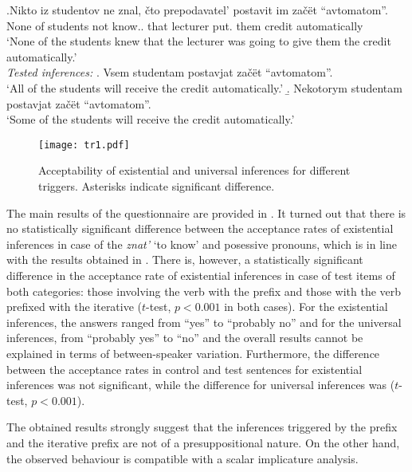 \exg.\label{ex:znat}Nikto iz studentov ne znal, \v{c}to prepodavatel' postavit im za\v{c}\"{e}t ``avtomatom''.\\
None of students not know.. that lecturer put. them credit automatically\\
\trans `None of the students knew that the lecturer was going to give them the credit automatically.'\smallskip\\
\textit{Tested inferences:}
\a. Vsem studentam postavjat za\v{c}\"et ``avtomatom''.\\
 `All of the students will receive the credit automatically.'
\b. Nekotorym studentam postavjat za\v{c}\"et ``avtomatom''.\\
 `Some of the students will receive the credit automatically.'

\begin{figure}
\texttt{[image: tr1.pdf]}
\caption{Acceptability of existential and universal inferences for different triggers. Asterisks indicate significant difference.}
\label{fig:results}
\end{figure}

The main results of the questionnaire are provided in . It turned out that there is no statistically significant difference between the acceptance rates of  existential inferences in case of the  \textit{znat'} `to know' and posessive pronouns, which is in line with the results obtained in \citealt{Chemla:09}. There is, however, a statistically significant difference in the acceptance rate of  existential inferences in case of test items of both categories: those involving the verb with the  prefix  and those with the verb prefixed with the iterative  ($t$-test, $p<0.001$ in both cases). For the existential inferences, the answers ranged from ``yes'' to ``probably no'' and for the universal inferences, from ``probably yes'' to ``no'' and the overall results cannot be explained in terms of between-speaker variation. Furthermore, the difference between the acceptance rates in control and
test sentences for existential inferences was not significant, while the
difference for universal inferences was ($t$-test, $p<0.001$).

The obtained results strongly suggest that the inferences triggered by the  prefix  and the iterative prefix  are not of a presuppositional nature. On the other hand, the observed behaviour is compatible with a scalar implicature analysis.


